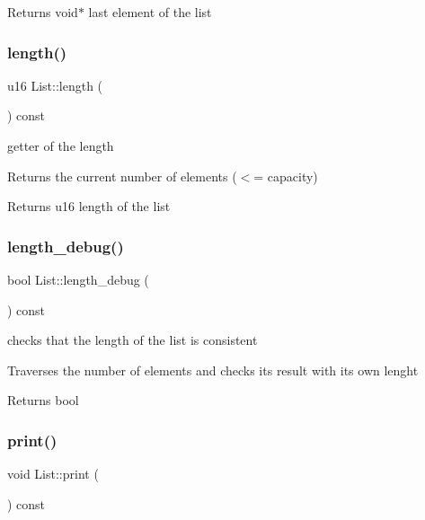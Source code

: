 \begin{DoxyReturn}{Returns}
void$\ast$ last element of the list 
\end{DoxyReturn}
\mbox{\label{class_list_a566b2ab22a13de70321ee2cbb237e17f}} 
\subsubsection{\texorpdfstring{length()}{length()}}
{\footnotesize\ttfamily u16 List\+::length (\begin{DoxyParamCaption}{ }\end{DoxyParamCaption}) const}



getter of the length 

Returns the current number of elements ($<$= capacity)

\begin{DoxyReturn}{Returns}
u16 length of the list 
\end{DoxyReturn}
\mbox{\label{class_list_a400fa1189445b0b554d56e5c3f40332e}} 
\subsubsection{\texorpdfstring{length\+\_\+debug()}{length\_debug()}}
{\footnotesize\ttfamily bool List\+::length\+\_\+debug (\begin{DoxyParamCaption}{ }\end{DoxyParamCaption}) const}



checks that the length of the list is consistent 

Traverses the number of elements and checks its result with its own lenght

\begin{DoxyReturn}{Returns}
bool 
\end{DoxyReturn}
\mbox{\label{class_list_af89a9b66f6d9da97918937c70bbb03d0}} 
\subsubsection{\texorpdfstring{print()}{print()}}
{\footnotesize\ttfamily void List\+::print (\begin{DoxyParamCaption}{ }\end{DoxyParamCaption}) const}




